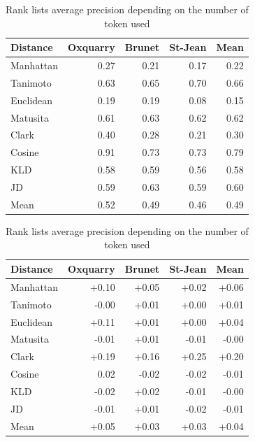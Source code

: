 \begin{table}
  \centering
  \caption{Rank lists average precision depending on the number of token used}

  \label{tab:baseline_every_token}
  \begin{tabular}{l r r r|r}
    \toprule
    Distance & Oxquarry & Brunet & St-Jean & Mean \\
    \midrule
    Manhattan & 0.27 & 0.21 & 0.17 & 0.22 \\
    Tanimoto  & 0.63 & 0.65 & 0.70 & 0.66 \\
    Euclidean & 0.19 & 0.19 & 0.08 & 0.15 \\
    Matusita  & 0.61 & 0.63 & 0.62 & 0.62 \\
    Clark     & 0.40 & 0.28 & 0.21 & 0.30 \\
    Cosine    & 0.91 & 0.73 & 0.73 & 0.79 \\
    KLD       & 0.58 & 0.59 & 0.56 & 0.58 \\
    JD        & 0.59 & 0.63 & 0.59 & 0.60 \\
    \midrule
    Mean      & 0.52 & 0.49 & 0.46 & 0.49 \\
    \bottomrule
  \end{tabular}

  \vspace{0.5cm}

  \label{tab:gain_without_hapax_legomena}
  \begin{tabular}{l r r r|r}
    \toprule
    Distance & Oxquarry & Brunet & St-Jean & Mean \\
    \midrule
    Manhattan & +0.10 & +0.05 & +0.02 & +0.06 \\
    Tanimoto  & -0.00 & +0.01 & +0.00 & +0.01 \\
    Euclidean & +0.11 & +0.01 & +0.00 & +0.04 \\
    Matusita  & -0.01 & +0.01 & -0.01 & -0.00 \\
    Clark     & +0.19 & +0.16 & +0.25 & +0.20 \\
    Cosine    &  0.02 & -0.02 & -0.02 & -0.01 \\
    KLD       & -0.02 & +0.02 & -0.01 & -0.00 \\
    JD        & -0.01 & +0.01 & -0.02 & -0.01 \\
    \midrule
    Mean      & +0.05 & +0.03 & +0.03 & +0.04 \\
    \bottomrule
  \end{tabular}


\end{table}
